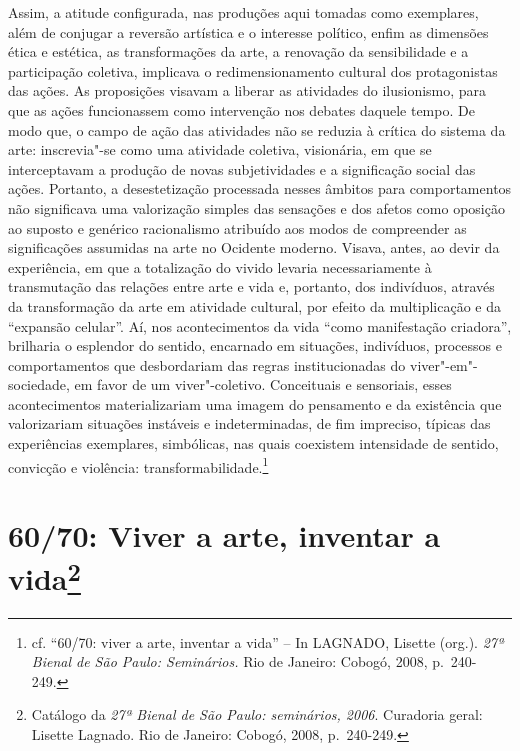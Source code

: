 Assim, a atitude configurada, nas produções aqui tomadas como
exemplares, além de conjugar a reversão artística e o interesse
político, enfim as dimensões ética e estética, as transformações da
arte, a renovação da sensibilidade e a participação coletiva, implicava
o redimensionamento cultural dos protagonistas das ações. As proposições
visavam a liberar as atividades do ilusionismo, para que as ações
funcionassem como intervenção nos debates daquele tempo. De modo que, o
campo de ação das atividades não se reduzia à crítica do sistema da
arte: inscrevia"-se como uma atividade coletiva, visionária, em que se
interceptavam a produção de novas subjetividades e a significação social
das ações. Portanto, a desestetização processada nesses âmbitos para
comportamentos não significava uma valorização simples das sensações e
dos afetos como oposição ao suposto e genérico racionalismo atribuído
aos modos de compreender as significações assumidas na arte no Ocidente
moderno. Visava, antes, ao devir da experiência, em que a totalização do
vivido levaria necessariamente à transmutação das relações entre arte e
vida e, portanto, dos indivíduos, através da transformação da arte em
atividade cultural, por efeito da multiplicação e da ``expansão
celular''. Aí, nos acontecimentos da vida ``como manifestação
criadora'', brilharia o esplendor do sentido, encarnado em situações,
indivíduos, processos e comportamentos que desbordariam das regras
institucionadas do viver"-em"-sociedade, em favor de um viver"-coletivo.
Conceituais e sensoriais, esses acontecimentos materializariam uma
imagem do pensamento e da existência que valorizariam situações
instáveis e indeterminadas, de fim impreciso, típicas das experiências
exemplares, simbólicas, nas quais coexistem intensidade de sentido,
convicção e violência: transformabilidade.\footnote{cf. ``60/70: viver a
  arte, inventar a vida'' -- In \textsc{LAGNADO}, Lisette (org.). \emph{27ª
  Bienal de São Paulo: Seminários.} Rio de Janeiro: Cobogó, 2008, p.~240-249.}

\chapter*{60/70: Viver a arte, inventar a vida\footnote{Catálogo da
  \emph{27ª Bienal de São Paulo: seminários, 2006}. Curadoria geral:
  Lisette Lagnado. Rio de Janeiro: Cobogó, 2008, p.~240-249.}}

